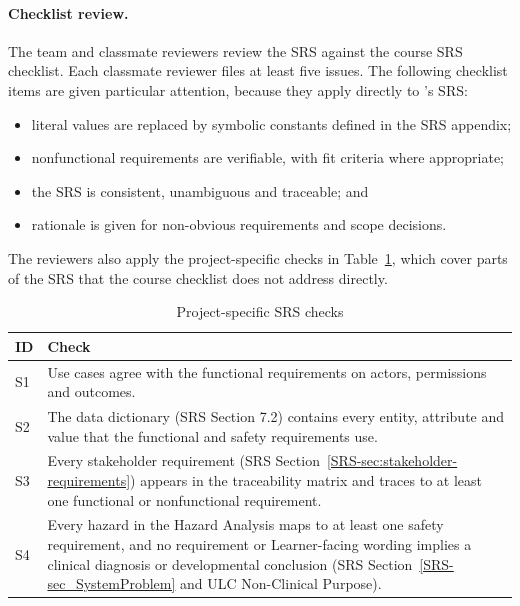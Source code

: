 \documentclass[12pt, titlepage]{article}
\newcommand{\srssectionref}[1]{SRS Section~\ref*{SRS-#1}}
\newcommand{\srsnamedref}[2]{#2}
\begin{document}
\paragraph{Checklist review.} The team and classmate reviewers review the SRS against the course SRS checklist. Each classmate reviewer files at least five issues. The following checklist items are given particular attention, because they apply directly to \progname{}'s SRS:
\begin{itemize}
  \item literal values are replaced by symbolic constants defined in the SRS appendix;
  \item nonfunctional requirements are verifiable, with fit criteria where appropriate;
  \item the SRS is consistent, unambiguous and traceable; and
  \item rationale is given for non-obvious requirements and scope decisions.
\end{itemize}
The reviewers also apply the project-specific checks in Table~\ref{tab:srs-checklist}, which cover parts of the SRS that the course checklist does not address directly.

\begin{table}[htbp]
\centering\small
\caption{Project-specific SRS checks}
\label{tab:srs-checklist}
\renewcommand{\arraystretch}{1.2}
\begin{tabularx}{\textwidth}{l >{\raggedright\arraybackslash}X}
\toprule
\textbf{ID} & \textbf{Check}\\
\midrule
S1 & Use cases agree with the functional requirements on actors, permissions and outcomes.\\
S2 & The data dictionary (SRS Section 7.2) contains every entity, attribute and value that the functional and safety requirements use.\\
S3 & Every stakeholder requirement (\srssectionref{sec:stakeholder-requirements}) appears in the traceability matrix and traces to at least one functional or nonfunctional requirement.\\
S4 & Every hazard in the Hazard Analysis maps to at least one safety requirement, and no requirement or Learner-facing wording implies a clinical diagnosis or developmental conclusion (\srssectionref{sec_SystemProblem} and \srsnamedref{ULC_NonClinicalPurpose}{ULC Non-Clinical Purpose}).\\
\bottomrule
\end{tabularx}
\end{table}
\end{document}
